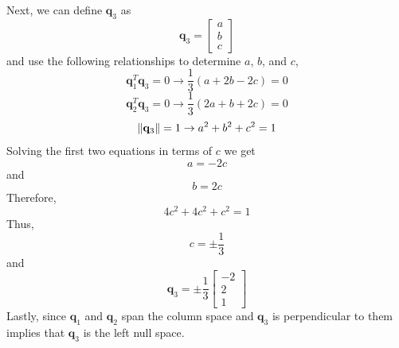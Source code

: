 \begin{mdframed}[style=MyFrame]
    \newcommand{\qvec}[1]{\mathbf{q}_{#1}}
    Next, we can define $\qvec{3}$ as
    \begin{equation}
        \qvec{3} =
        \begin{bmatrix}
            a       \\
            b       \\
            c
        \end{bmatrix}
    \end{equation}
    and use the following relationships to determine $a$, $b$, and $c$,
    \begin{equation}
        \qvec{1}^{T}\qvec{3} = 0 \rightarrow
                \frac{1}{3} (a + 2b -2c) = 0
    \end{equation}
    \begin{equation}
        \qvec{2}^{T}\qvec{3} = 0 \rightarrow
                \frac{1}{3} (2a + b + 2c) = 0
    \end{equation}
    \begin{equation}
        \norm{\qvec{3}} = 1 \rightarrow a^{2} + b^{2} + c^{2} = 1
    \end{equation}
    Solving the first two equations in terms of $c$ we get
    \begin{equation}
        a = -2c
    \end{equation}
    and 
    \begin{equation}
        b = 2c
    \end{equation}
    Therefore,
    \begin{equation}
        4c^{2} + 4c^{2} + c^{2} = 1
    \end{equation}
    Thus, 
    \begin{equation}
        c = \pm \frac{1}{3}
    \end{equation}
    and 
    \begin{equation}
        \qvec{3} =
        \pm
        \frac{1}{3}
        \begin{bmatrix}
            -2      \\
            2       \\
            1
        \end{bmatrix}
    \end{equation}
    Lastly, since $\qvec{1}$ and $\qvec{2}$ span the column space and
    $\qvec{3}$ is perpendicular to them implies that $\qvec{3}$ is the left
    null space.
\end{mdframed}
